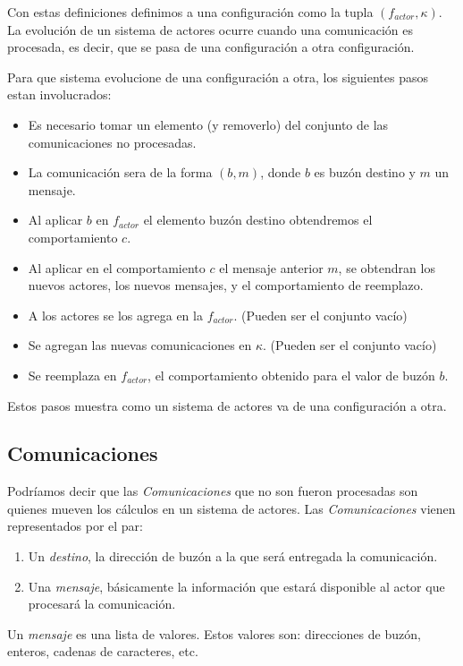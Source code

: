 Con estas definiciones definimos a una configuración como la tupla $(f_{actor}, \kappa)$. La evolución de un sistema de actores ocurre cuando una comunicación es procesada, es decir, que se pasa de una configuración a otra configuración.

Para que sistema evolucione de una configuración a otra, los siguientes pasos estan involucrados:
\begin{itemize}
 \item Es necesario tomar un elemento (y removerlo) del conjunto de las comunicaciones no procesadas. 
 \item La comunicación sera de la forma $(b,m)$, donde $b$ es buzón destino y $m$ un mensaje. 
 \item Al aplicar $b$ en $f_{actor}$ el elemento buzón destino obtendremos el comportamiento $c$. 
 \item Al aplicar en el comportamiento $c$ el mensaje anterior $m$, se obtendran los nuevos actores, los nuevos mensajes, y el comportamiento de reemplazo.
 \item A los actores se los agrega en la $f_{actor}$. (Pueden ser el conjunto vacío)
 \item Se agregan las nuevas comunicaciones en $\kappa$. (Pueden ser el conjunto vacío)
 \item Se reemplaza en $f_{actor}$, el comportamiento obtenido para el valor de buzón $b$.
\end{itemize} 

Estos pasos muestra como un sistema de actores va de una configuración a otra.

\subsection{Comunicaciones}

Podríamos decir que las \textit{Comunicaciones} que no son fueron procesadas son quienes mueven los cálculos en un sistema de actores. Las \textit{Comunicaciones} vienen representados por el par:

\begin{enumerate}
\item Un \textit{destino}, la dirección de buzón a la que será entregada la comunicación. 
\item Una \textit{mensaje}, básicamente la información que estará disponible al actor que procesará la comunicación.
\end{enumerate}

Un \textit{mensaje} es una lista de valores. Estos valores son: direcciones de buzón, enteros, cadenas de caracteres, etc. 

